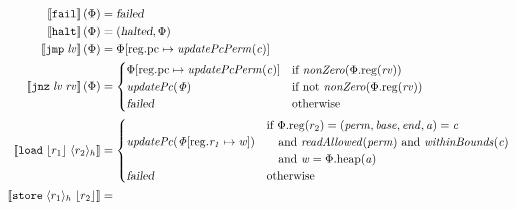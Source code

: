 \documentclass{article}
\newcommand{\update}[2]{[#1 \mapsto #2]}
\newcommand{\sem}[1]{\left\llbracket #1 \right\rrbracket}
\newcommand{\var}[1]{\mathit{#1}}
\newcommand{\rv}{\var{rv}}
\newcommand{\lv}{\var{lv}}
\newcommand{\pcreg}{\mathrm{pc}}
\newcommand{\addr}{\var{a}}
\newcommand{\start}{\var{base}}
\newcommand{\addrend}{\var{end}}
\newcommand{\perm}{\var{perm}}
\newcommand{\plainproj}[1]{\mathrm{#1}}
\newcommand{\memheap}[1][\Phi]{#1.\plainproj{heap}}
\newcommand{\memreg}[1][\Phi]{#1.\plainproj{reg}}
\newcommand{\updateReg}[3][\Phi]{#1\update{\plainproj{reg}.#2}{#3}}
\newcommand{\failed}{\textsl{failed}}
\newcommand{\halted}{\textsl{halted}}
\newcommand{\plainfun}[1]{\mathit{#1}}
\newcommand{\updatePcPerm}[1]{\plainfun{updatePcPerm}(#1)}
\newcommand{\nonZero}[1]{\plainfun{nonZero}(#1)}
\newcommand{\readAllowed}[1]{\plainfun{readAllowed}(#1)}
\newcommand{\withinBounds}[1]{\plainfun{withinBounds}(#1)}
\newcommand{\stdUpdatePc}[1]{\plainfun{updatePc(#1)}}
\newcommand{\refreg}[1]{\lfloor #1 \rfloor}
\newcommand{\refheap}[1]{\langle #1 \rangle_h}
\newcommand{\fail}{\instr{fail}}
\newcommand{\halt}{\instr{halt}}
\newcommand{\instr}[1]{\mathtt{#1}}
\newcommand{\oneinstr}[2]{\instr{#1} \; #2}
\newcommand{\jmp}[1]{\oneinstr{jmp}{#1}}
\newcommand{\twoinstr}[3]{\instr{#1} \; #2 \; #3}
\newcommand{\jnz}[2]{\twoinstr{jnz}{#1}{#2}}
\newcommand{\store}[2]{\twoinstr{store}{#1}{#2}}
\newcommand{\load}[2]{\twoinstr{load}{#1}{#2}}
\begin{document}
\begin{align*}
  \sem{\fail}(\Phi)                        & = \failed \\
  \sem{\halt}(\Phi)                        & = (\halted,\Phi) \\
  \sem{\jmp{\lv}}(\Phi)                    & = \updateReg{\pcreg}{\updatePcPerm{\var{c}}} \\
  \sem{\jnz{\lv}{\rv}}(\Phi)               & = 
                                             \begin{cases}
                                               \updateReg{\pcreg}{\updatePcPerm{\var{c}}} &
                                               \arraycolsep=0pt
                                               \begin{array}{l}
                                                 \text{if $\nonZero{\memreg(\rv)}$} 
                                               \end{array}\\
                                               \stdUpdatePc{\Phi} & \text{if not $\nonZero{\memreg(\rv)}$}\\
                                               \failed & \text{otherwise }
                                             \end{cases} \\
 \sem{\load{\refreg{r_1}}{\refheap{r_2}}}  & = 
                                             \begin{cases}
                                               \stdUpdatePc{\updateReg{r_1}{\var{w}}} &
                                               \arraycolsep=0pt
                                               \begin{array}{l}
                                                 \text{if }\memreg(r_2) = (\perm,\start,\addrend,\addr) = \var{c} \\
                                                 \quad\text{and }\readAllowed{\perm} \text{ and } \withinBounds{\var{c}} \\
                                                 \quad\text{and }\var{w} = \memheap(\addr)
                                               \end{array}\\
                                               \failed & \text{otherwise }
                                             \end{cases}\\
 \sem{\store{\refheap{r_1}}{\refreg{r_2}}} & = 

\end{align*}
\end{document}
